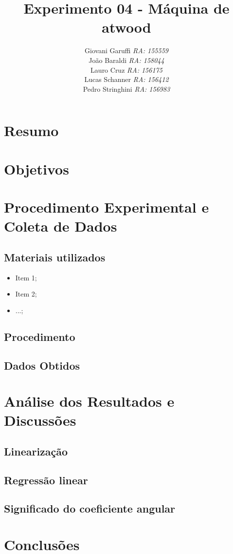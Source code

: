 \documentclass[12pt,a4paper]{article}
\begin{document}
\title{\vspace{70mm}\Huge Experimento 04 - Máquina de atwood}
\author{ Giovani Garuffi\qquad\hfill
		\textit {RA: 155559}\protect\\
		João Baraldi\hfill
		\textit{RA: 158044}\protect\\
		Lauro Cruz\hfill
		\textit{RA: 156175}\protect\\
		Lucas Schanner\hfill
		\textit{RA: 156412}\protect\\
		Pedro Stringhini\hfill
		\textit {RA: 156983}								
		}
\maketitle
\newpage
\section{Resumo}

\section{Objetivos}


\section{Procedimento Experimental e Coleta de Dados}

\subsection{Materiais utilizados}

\begin{itemize}
	\item Item 1;
	\item Item 2;
	\item ...;
\end{itemize}

\subsection{Procedimento}





\subsection{Dados Obtidos}


\section{Análise dos Resultados e Discussões}
\subsection{Linearização}


\subsection{Regressão linear}

\subsection{Significado do coeficiente angular}

\section{Conclusões}
\end{document}
